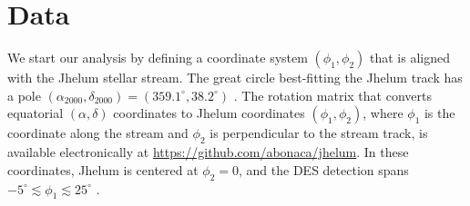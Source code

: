 \documentclass[twocolumn]{aastex62}
\begin{document}
%
%


\section{Data}
\label{sec:data}
We start our analysis by defining a coordinate system $(\phi_1,\phi_2)$ that is aligned with the Jhelum stellar stream.
The great circle best-fitting the Jhelum track has a pole $(\alpha_{2000},\delta_{2000}) = (359.1^\circ, 38.2^\circ)$ \citep{shipp2018}.
The rotation matrix that converts equatorial $(\alpha, \delta)$ coordinates to Jhelum coordinates $(\phi_1, \phi_2)$, where $\phi_1$ is the coordinate along the stream and $\phi_2$ is perpendicular to the stream track, is available electronically at \url{https://github.com/abonaca/jhelum}.
In these coordinates, Jhelum is centered at $\phi_2=0$, and the DES detection spans $-5^\circ\lesssim\phi_1\lesssim25^\circ$ \citep{shipp2018}.
\end{document}
